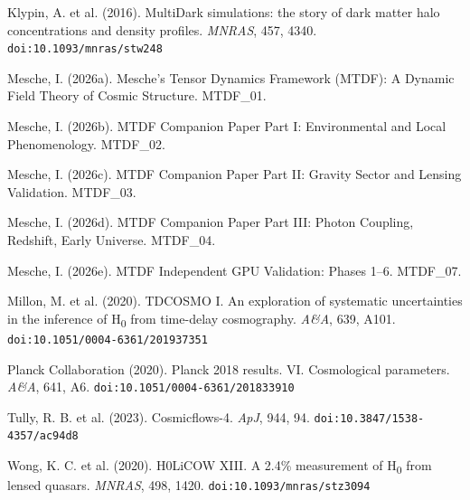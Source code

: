 \documentclass[11pt,a4paper]{article}
\begin{document}
Klypin, A. et al. (2016). MultiDark simulations: the story of dark matter halo concentrations and density profiles. \emph{MNRAS}, 457, 4340. \texttt{doi:10.1093/\allowbreak{}mnras/\allowbreak{}stw248}

Mesche, I. (2026a). Mesche's Tensor Dynamics Framework (MTDF): A Dynamic Field Theory of Cosmic Structure. MTDF\_\allowbreak{}01.

Mesche, I. (2026b). MTDF Companion Paper Part I: Environmental and Local Phenomenology. MTDF\_\allowbreak{}02.

Mesche, I. (2026c). MTDF Companion Paper Part II: Gravity Sector and Lensing Validation. MTDF\_\allowbreak{}03.

Mesche, I. (2026d). MTDF Companion Paper Part III: Photon Coupling, Redshift, Early Universe. MTDF\_\allowbreak{}04.

Mesche, I. (2026e). MTDF Independent GPU Validation: Phases 1--6. MTDF\_\allowbreak{}07.

Millon, M. et al. (2020). TDCOSMO I. An exploration of systematic uncertainties in the inference of H\textsubscript{0} from time-delay cosmography. \emph{A\&A}, 639, A101. \texttt{doi:10.1051/\allowbreak{}0004-6361/\allowbreak{}201937351}

Planck Collaboration (2020). Planck 2018 results. VI. Cosmological parameters. \emph{A\&A}, 641, A6. \texttt{doi:10.1051/\allowbreak{}0004-6361/\allowbreak{}201833910}

Tully, R. B. et al. (2023). Cosmicflows-4. \emph{ApJ}, 944, 94. \texttt{doi:10.3847/\allowbreak{}1538-4357/\allowbreak{}ac94d8}

Wong, K. C. et al. (2020). H0LiCOW XIII. A 2.4\% measurement of H\textsubscript{0} from lensed quasars. \emph{MNRAS}, 498, 1420. \texttt{doi:10.1093/\allowbreak{}mnras/\allowbreak{}stz3094}
\end{document}
